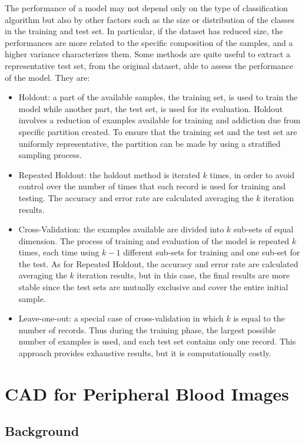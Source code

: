 \documentclass[final,a4paper,12pt,english]{UnicaPhdThesis3}
\begin{document}
The performance of a model may not depend only on the type of classification algorithm but also by other factors such as the size or distribution of the classes in the training and test set. In particular, if the dataset has reduced size, the performances are more related to the specific composition of the samples, and a higher variance characterizes them. Some methods are quite useful to extract a representative test set, from the original dataset, able to assess the performance of the model. They are:
\begin{itemize}
	\item Holdout: a part of the available samples, the training set, is used to train the model while another part, the test set, is used for its evaluation. Holdout involves a reduction of examples available for training and addiction due from specific partition created. To ensure that the training set and the test set are uniformly representative, the partition can be made by using a stratified sampling process.
	\item Repeated Holdout: the holdout method is iterated $k$ times, in order to avoid control over the number of times that each record is used for training and testing. The accuracy and error rate are calculated averaging the $k$ iteration results.
	\item Cross-Validation: the examples available are divided into $k$ sub-sets of equal dimension. The process of training and evaluation of the model is repeated $k$ times, each time using $k-1$ different sub-sets for training and one sub-set for the test. As for Repeated Holdout, the accuracy and error rate are calculated averaging the $k$ iteration results, but in this case, the final results are more stable since the test sets are mutually exclusive and cover the entire initial sample.
	\item Leave-one-out: a special case of cross-validation in which $k$ is equal to the number of records. Thus during the training phase, the largest possible number of examples is used, and each test set contains only one record. This approach provides exhaustive results, but it is computationally costly.
\end{itemize}


\part{CAD for Peripheral Blood Images} \label{due}

\chapter{Background}
\end{document}
